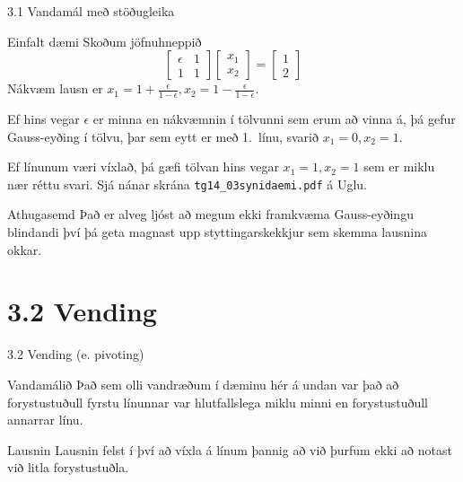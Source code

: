 \begin{frame}{3.1 Vandamál með stöðugleika} 
\begin{block}{Einfalt dæmi}
 Skoðum jöfnuhneppið
$$
\left[\begin{array}{ll}
\epsilon & 1\\
1 & 1
\end{array}\right] \left[\begin{array}{l}
x_1\\
x_2
\end{array}\right] 
=\left[\begin{array}{l}
1\\
2
\end{array}\right]
$$
\pause
Nákvæm lausn er $x_1=1+\frac{\epsilon}{1-\epsilon}, 
x_2=1-\frac{\epsilon}{1-\epsilon}$. \pause

Ef hins vegar $\epsilon$ er minna en nákvæmnin í tölvunni sem erum að vinna á, þá 
gefur Gauss-eyðing í tölvu, þar sem eytt er með 1.~línu, svarið $x_1 = 0, x_2 = 1$. \pause

Ef línunum væri víxlað, þá gæfi tölvan hins vegar $x_1=1, x_2=1$ sem er miklu nær réttu svari.
Sjá nánar skrána {\tt tg14\_03synidaemi.pdf} á Uglu. 
\end{block}

\pause

\begin{block}{Athugasemd}
 Það er alveg ljóst að megum ekki framkvæma Gauss-eyðingu blindandi því þá 
 geta
magnast upp styttingarskekkjur sem skemma lausnina okkar.
\end{block}
\end{frame}

\section*{3.2 Vending}

\begin{frame}{3.2 Vending (e. pivoting)}
 \begin{block}{Vandamálið}
  Það sem olli vandræðum í dæminu hér á undan var það að forystustuðull
fyrstu línunnar var hlutfallslega miklu minni en forystustuðull annarrar línu.
 \end{block}

\begin{block}{Lausnin}
 Lausnin felst í því að víxla á línum þannig að við þurfum ekki að notast
við litla forystustuðla.
\end{block}
\end{frame}

